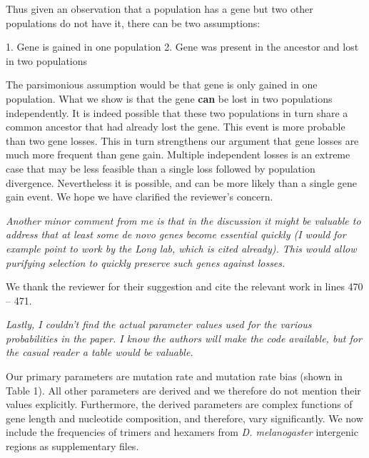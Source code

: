 \documentclass[12pt,a4paper]{article}
\begin{document}
Thus given an observation that a population has a gene but two other populations do not have it, there can be two assumptions:

1. Gene is gained in one population
2. Gene was present in the ancestor and lost in two populations

The parsimonious assumption would be that gene is only gained in one population. What we show is that the gene \textbf{can} be lost in two populations independently. It is indeed possible that these two populations in turn share a common ancestor that had already lost the gene. This event is more probable than two gene losses. This in turn strengthens our argument that gene losses are much more frequent than gene gain. Multiple independent losses is an extreme case that may be less feasible than a single loss followed by population divergence. Nevertheless it is possible, and can be more likely than a single gene gain event. We hope we have clarified the reviewer's concern.

{\itshape Another minor comment from me is that in the discussion it might be valuable to address that at least some de novo genes become essential quickly (I would for example point to work by the Long lab, which is cited already). This would allow purifying selection to quickly preserve such genes against losses.}

We thank the reviewer for their suggestion and cite the relevant work in lines 470 -- 471.

{\itshape Lastly, I couldn't find the actual parameter values used for the various probabilities in the paper. I know the authors will make the code available, but for the casual reader a table would be valuable.}

Our primary parameters are mutation rate and mutation rate bias (shown in Table 1). All other parameters are derived and we therefore do not mention their values explicitly. Furthermore, the derived parameters are complex functions of gene length and nucleotide composition, and therefore, vary significantly. We now include the frequencies of trimers and hexamers from \textit{D. melanogaster} intergenic regions as supplementary files. 
\end{document}
